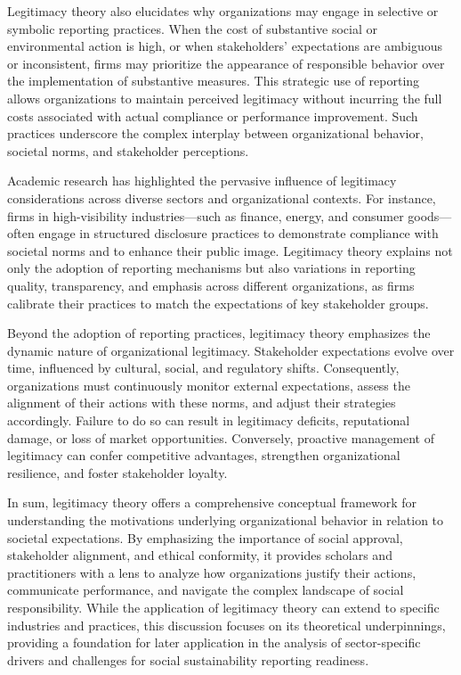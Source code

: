 Legitimacy theory also elucidates why organizations may engage in selective or symbolic reporting practices. 
When the cost of substantive social or environmental action is high, or when stakeholders’ expectations are 
ambiguous or inconsistent, firms may prioritize the appearance of responsible behavior over the implementation 
of substantive measures. This strategic use of reporting allows organizations to maintain perceived legitimacy 
without incurring the full costs associated with actual compliance or performance improvement. Such practices 
underscore the complex interplay between organizational behavior, societal norms, and stakeholder perceptions.

Academic research has highlighted the pervasive influence of legitimacy considerations across diverse sectors 
and organizational contexts. For instance, firms in high-visibility industries—such as finance, energy, and 
consumer goods—often engage in structured disclosure practices to demonstrate compliance with societal norms 
and to enhance their public image. Legitimacy theory explains not only the adoption of reporting mechanisms 
but also variations in reporting quality, transparency, and emphasis across different organizations, as firms 
calibrate their practices to match the expectations of key stakeholder groups.

Beyond the adoption of reporting practices, legitimacy theory emphasizes the dynamic nature of organizational 
legitimacy. Stakeholder expectations evolve over time, influenced by cultural, social, and regulatory shifts.
Consequently, organizations must continuously monitor external expectations, assess the alignment of their actions 
with these norms, and adjust their strategies accordingly. Failure to do so can result in legitimacy deficits, 
reputational damage, or loss of market opportunities. Conversely, proactive management of legitimacy can confer 
competitive advantages, strengthen organizational resilience, and foster stakeholder loyalty.

In sum, legitimacy theory offers a comprehensive conceptual framework for understanding the motivations underlying 
organizational behavior in relation to societal expectations. By emphasizing the importance of social approval, 
stakeholder alignment, and ethical conformity, it provides scholars and practitioners with a lens to analyze how 
organizations justify their actions, communicate performance, and navigate the complex landscape of social responsibility. 
While the application of legitimacy theory can extend to specific industries and practices, this discussion focuses on its 
theoretical underpinnings, providing a foundation for later application in the analysis of sector-specific drivers and 
challenges for social sustainability reporting readiness.



